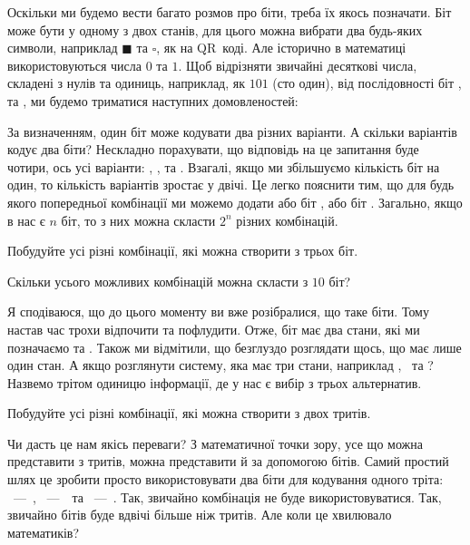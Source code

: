 Оскільки ми будемо вести багато розмов про біти, треба їх якось позначати.
Біт може бути у одному з двох станів, для цього можна вибрати два будь-яких символи, наприклад $\blacksquare$ та $\square$, як на QR~коді.
Але історично в математиці використовуються числа $0$ та $1$.
Щоб відрізняти звичайні десяткові числа, складені з нулів та одиниць, наприклад, як  $101$ (сто один),  від послідовності біт ,  та , ми будемо триматися наступних домовленостей:
\bitdesc

За визначенням, один біт може кодувати два різних варіанти. А скільки варіантів кодує два біти? Нескладно порахувати, що відповідь на це запитання буде чотири, ось усі варіанти: , ,  та . Взагалі, якщо ми збільшуємо кількість біт на один, то кількість варіантів зростає у двічі.
Це легко пояснити тим, що для будь якого попередньої комбінації ми можемо додати або біт , або біт .
Загально, якщо в нас є $n$ біт, то з них можна скласти $2^n$ різних комбінацій.

\begin{exercise}
Побудуйте усі різні комбінації, які можна створити з трьох біт.
\end{exercise}

\begin{exercise}
Скільки усього можливих комбінацій можна скласти з $10$ біт?
\end{exercise}

Я сподіваюся, що до цього моменту ви вже розібралися, що таке біти.
Тому настав час трохи відпочити та пофлудити.
Отже, біт має два стани, які ми позначаємо  та .
Також ми відмітили, що безглуздо розглядати щось, що має лише один стан.
А якщо розглянути систему, яка має три стани, наприклад \tritzero, \tritone\ та \trithalf?
 Назвемо трітом одиницю інформації, де у нас є вибір з трьох альтернатив.

\begin{exercise}
Побудуйте усі різні комбінації, які можна створити з двох тритів.
\end{exercise}

Чи дасть це нам якісь переваги?
З математичної точки зору, усе що можна представити з тритів, можна представити й за допомогою бітів.
Самий простий шлях це зробити просто використовувати два біти для кодування одного тріта: ~—~\tritzero, ~—~\tritone\ та ~—~\trithalf.
Так, звичайно комбінація  не буде використовуватися.
Так, звичайно бітів буде вдвічі більше ніж тритів.
Але коли це хвилювало математиків?


